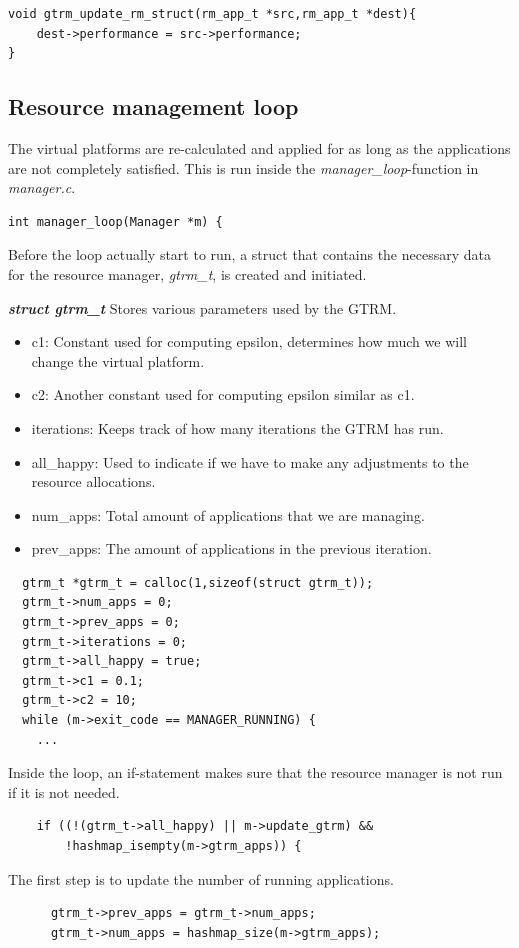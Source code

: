 \documentclass[nobiblatex]{LTHthesis}
\begin{document}
\begin{verbatim}
void gtrm_update_rm_struct(rm_app_t *src,rm_app_t *dest){
	dest->performance = src->performance;			
}
\end{verbatim}



\subsection{Resource management loop}
The virtual platforms are re-calculated and applied for as long as the applications are not completely satisfied. This is run inside the \emph{manager\_loop}-function in \emph{manager.c}.

\begin{verbatim}
int manager_loop(Manager *m) {
\end{verbatim}
Before the loop actually start to run, a struct that contains the necessary data for the resource manager, \emph{gtrm\_t}, is created and initiated.

\begin{framed}
		\begin{flushleft}
		
				\textbf{\emph{{struct gtrm\_t}}} \newline
				Stores various parameters used by the GTRM.
				\begin{itemize}
				\item c1: Constant used for computing epsilon, determines how much we will change the virtual platform.
				\item c2: Another constant used for computing epsilon similar as c1.
				\item iterations: Keeps track of how many iterations the GTRM has run.
				\item all\_happy: Used to indicate if we have to make any adjustments to the resource allocations.
				\item num\_apps: Total amount of applications that we are managing.
				\item prev\_apps: The amount of applications in the previous iteration.
				\end{itemize}
		\end{flushleft}	
\end{framed}

\begin{verbatim}
  gtrm_t *gtrm_t = calloc(1,sizeof(struct gtrm_t));
  gtrm_t->num_apps = 0;
  gtrm_t->prev_apps = 0;
  gtrm_t->iterations = 0;
  gtrm_t->all_happy = true;
  gtrm_t->c1 = 0.1;
  gtrm_t->c2 = 10;
  while (m->exit_code == MANAGER_RUNNING) {
    ...
\end{verbatim}
Inside the loop, an if-statement makes sure that the resource manager is not run if it is not needed. 
\begin{verbatim}
    if ((!(gtrm_t->all_happy) || m->update_gtrm) && 
        !hashmap_isempty(m->gtrm_apps)) {
\end{verbatim}
The first step is to update the number of running applications.
\begin{verbatim}
      gtrm_t->prev_apps = gtrm_t->num_apps;
      gtrm_t->num_apps = hashmap_size(m->gtrm_apps);
\end{verbatim}
\end{document}
